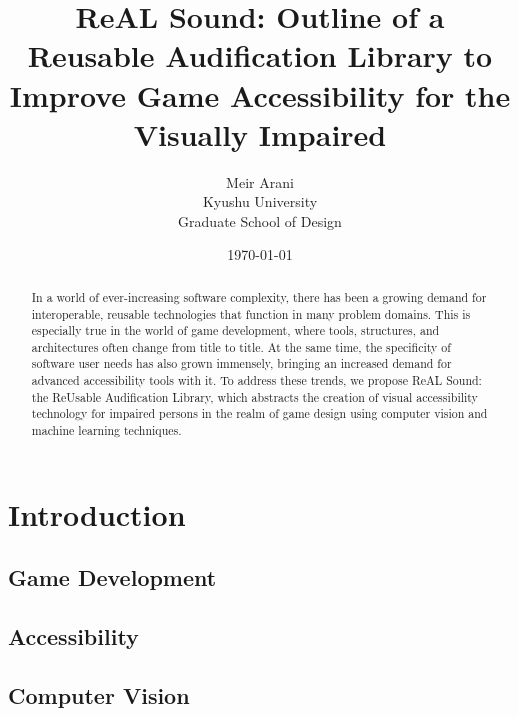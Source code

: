 \documentclass{report}
\begin{document}

\author{Meir Arani \\ Kyushu University \\ Graduate School of Design} %
\title{ReAL Sound: Outline of a Reusable Audification Library to Improve Game Accessibility for the Visually Impaired} %
\date{\today{}} 
\maketitle{} %


\begin{abstract}
    In a world of ever-increasing software complexity, there has been a growing demand for interoperable, reusable technologies that function in many problem domains. This is especially true in the world of game development, where tools, structures, and architectures often change from title to title. At the same time, the specificity of software user needs has also grown immensely, bringing an increased demand for advanced accessibility tools with it. To address these trends, we propose ReAL Sound: the ReUsable Audification Library, which abstracts the creation of visual accessibility technology for impaired persons in the realm of game design using computer vision and machine learning techniques.  
\end{abstract}

\newpage{} %


\tableofcontents{} %
\newpage{} %



\chapter{Introduction}
\section{Game Development}
\section{Accessibility}
\section{Computer Vision}
\end{document}
